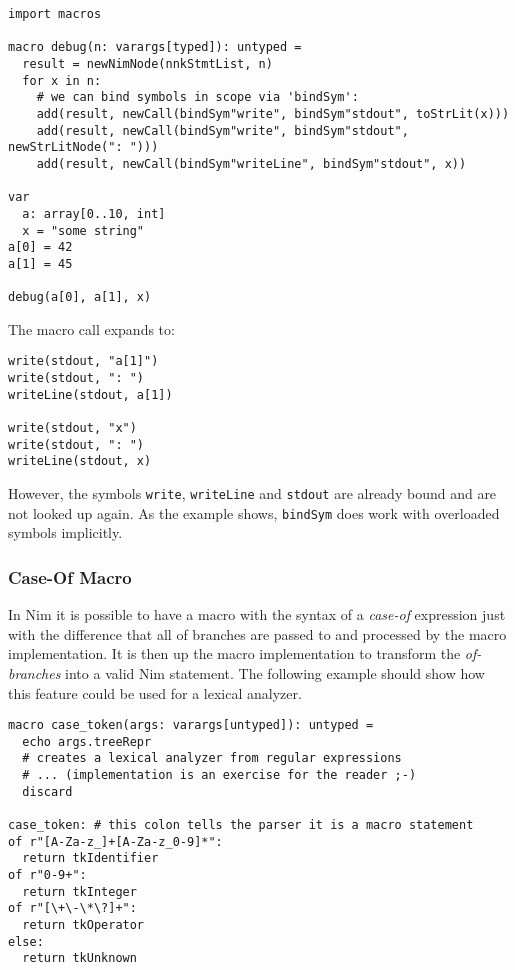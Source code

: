 \begin{verbatim}
import macros

macro debug(n: varargs[typed]): untyped =
  result = newNimNode(nnkStmtList, n)
  for x in n:
    # we can bind symbols in scope via 'bindSym':
    add(result, newCall(bindSym"write", bindSym"stdout", toStrLit(x)))
    add(result, newCall(bindSym"write", bindSym"stdout", newStrLitNode(": ")))
    add(result, newCall(bindSym"writeLine", bindSym"stdout", x))

var
  a: array[0..10, int]
  x = "some string"
a[0] = 42
a[1] = 45

debug(a[0], a[1], x)
\end{verbatim}

The macro call expands to:

\begin{verbatim}
write(stdout, "a[1]")
write(stdout, ": ")
writeLine(stdout, a[1])

write(stdout, "x")
write(stdout, ": ")
writeLine(stdout, x)
\end{verbatim}

However, the symbols \texttt{write}, \texttt{writeLine} and
\texttt{stdout} are already bound and are not looked up again. As the
example shows, \texttt{bindSym} does work with overloaded symbols
implicitly.

\hypertarget{case-of-macro}{%
\subsubsection{Case-Of Macro}\label{case-of-macro}}

In Nim it is possible to have a macro with the syntax of a
\emph{case-of} expression just with the difference that all of branches
are passed to and processed by the macro implementation. It is then up
the macro implementation to transform the \emph{of-branches} into a
valid Nim statement. The following example should show how this feature
could be used for a lexical analyzer.

\begin{verbatim}
macro case_token(args: varargs[untyped]): untyped =
  echo args.treeRepr
  # creates a lexical analyzer from regular expressions
  # ... (implementation is an exercise for the reader ;-)
  discard

case_token: # this colon tells the parser it is a macro statement
of r"[A-Za-z_]+[A-Za-z_0-9]*":
  return tkIdentifier
of r"0-9+":
  return tkInteger
of r"[\+\-\*\?]+":
  return tkOperator
else:
  return tkUnknown
\end{verbatim}

